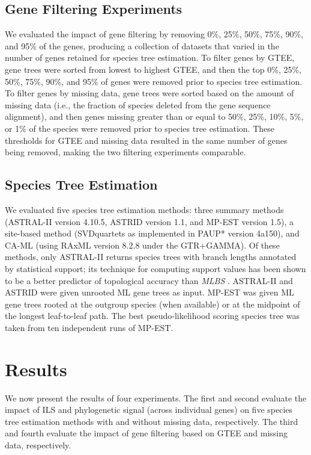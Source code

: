 \subsection{Gene Filtering Experiments}
We evaluated the impact of gene filtering by removing 0\%, 25\%, 50\%, 75\%, 90\%, and 95\% of the genes, producing a collection of datasets that varied in the number of genes retained for species tree estimation. 
To filter genes by GTEE, gene trees were sorted from lowest to highest GTEE, and then the top 0\%, 25\%, 50\%, 75\%, 90\%, and 95\% of genes were removed prior to species tree estimation. 
To filter genes by missing data, gene trees were sorted based on the amount of missing data (i.e., the fraction of species deleted from the gene sequence alignment), and then genes missing greater than or equal to 50\%, 25\%, 10\%, 5\%, or 1\% of the species were removed prior to species tree estimation. 
These thresholds for GTEE and missing data resulted in the same number of genes being removed, making the two filtering experiments comparable.

\subsection{Species Tree Estimation}
We evaluated five species tree estimation methods: three summary methods (ASTRAL-II version 4.10.5, ASTRID version 1.1, and MP-EST version 1.5), a site-based method (SVDquartets as implemented in \gls{PAUP*} version 4a150), and CA-ML (using RAxML version 8.2.8 under the GTR+GAMMA).
Of these methods, only ASTRAL-II returns species trees with branch lengths annotated by statistical support; its technique for computing support values has been shown to be a better predictor of topological accuracy than \textit{\gls{MLBS}} \cite{sayyari2016fast}.
ASTRAL-II and ASTRID were given \gls{unrooted} ML gene trees as input.
MP-EST was given ML gene trees \gls{rooted} at the outgroup species (when available) or at the midpoint of the longest leaf-to-leaf path.
The best pseudo-likelihood scoring species tree was taken from ten independent runs of MP-EST.

\section{Results}
\label{sec:include-results}
We now present the results of four experiments. 
The first and second evaluate the impact of ILS and phylogenetic signal (across individual genes) on five species tree estimation methods with and without missing data, respectively.
The third and fourth evaluate the impact of gene filtering based on GTEE and missing data, respectively. 

